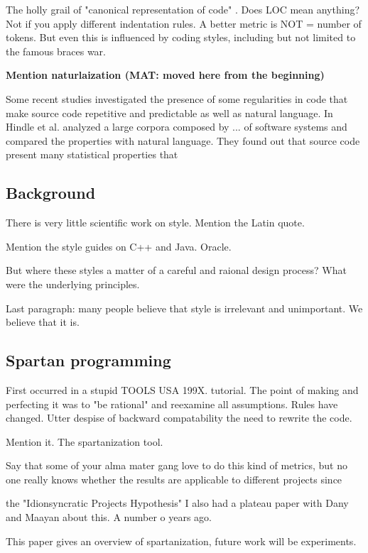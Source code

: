 The holly grail of "canonical representation of code" .
Does LOC mean anything?
Not if you apply different indentation rules.
A better metric is NOT = number of tokens.
But even this is influenced by coding styles, including but 
not limited to the famous braces war.

\textbf{Mention naturlaization (MAT: moved here from the beginning)}

Some recent studies investigated the presence of some regularities in code that 
make source code repetitive and predictable as well as natural language.
In Hindle et al. \cite{Hindle:Bar:Su:Gabel:Devanbu:2012} analyzed a large corpora composed
by ... of software systems and compared the properties with natural language.
They found out that source code present many statistical properties that 

\subsection{Background}
There is very little scientific work on style.
Mention the Latin quote.

Mention the style guides on C++ and Java. Oracle.

But where these styles a matter of a careful and raional design process?
What were the underlying principles.

Last paragraph: many people believe that style is irrelevant and unimportant. 
We believe that it is.

\subsection{Spartan programming}
First occurred in a stupid TOOLS USA 199X. tutorial.
The point of making and perfecting it was to "be rational" and 
reexamine all assumptions. 
Rules have changed.
Utter despise of backward compatability the need to rewrite the code.

Mention it.  The spartanization tool.

Say that some of your alma mater gang love to do this kind of metrics, but 
no one really knows whether the results are applicable to different projects
since 
\cite{Turnu:Concas:Marchesi:Tonelli:11}

the "Idionsyncratic Projects Hypothesis" I also had a plateau paper with 
Dany and Maayan about this. A number o years ago.


This paper gives an overview of spartanization, future work will be
experiments.


